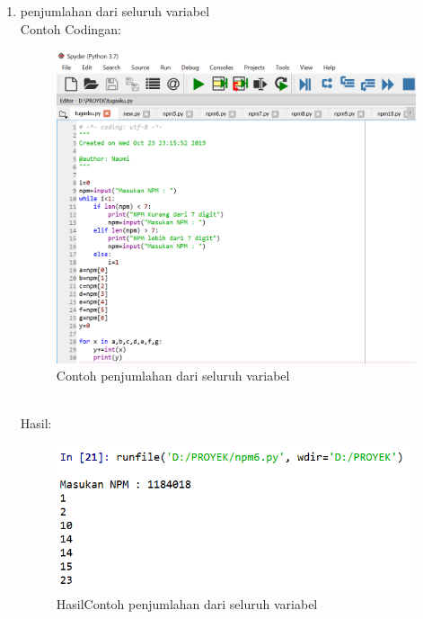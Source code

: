\begin{enumerate}
    \newpage
    \item penjumlahan dari seluruh variabel \\
    Contoh Codingan:
    \begin{figure}[!htbp]
    \centering
    \includegraphics[width=13cm]{gambar2/penjumlahan.png}
    \caption{Contoh penjumlahan dari seluruh variabel}
    \end{figure}\\
    Hasil:
    \begin{figure}[!htbp]
    \centering
    \includegraphics[width=14cm]{gambar2/penjumlahan1.png}
    \caption{HasilContoh penjumlahan dari seluruh variabel}
    \end{figure}
    

\end{enumerate}
